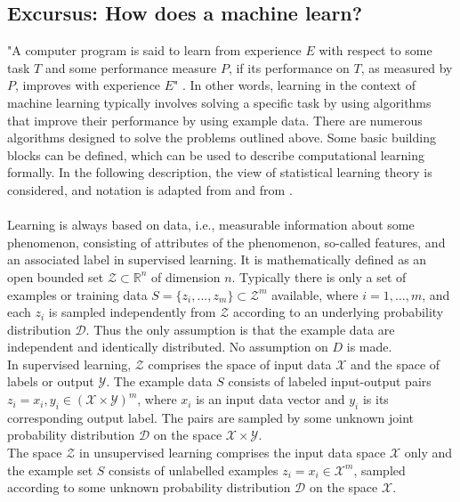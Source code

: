 \begin{tcolorbox}
    \subsection*{Excursus: How does a machine learn?}
    "A computer program is said to learn from experience $E$ with respect to some task $T$ and some performance measure $P$, if its performance on $T$, as measured by $P$, improves with experience $E$" \cite{Mitchell1997}. In other words, learning in the context of machine learning typically involves solving a specific task by using algorithms that improve their performance by using example data. There are numerous algorithms designed to solve the problems outlined above. Some basic building blocks can be defined, which can be used to describe computational learning formally. In the following description, the view of statistical learning theory is considered, and notation is adapted from \citeauthor{Shalev2014} \cite{Shalev2014} and from \citeauthor{Von_luxburg2011} \cite{Von_luxburg2011}.\\
    \\
    Learning is always based on data, i.e., measurable information about some phenomenon, consisting of attributes of the phenomenon, so-called features, and an associated label in supervised learning. It is mathematically defined as an open bounded set $\mathcal{Z}\subset\mathbb{R}^n$ of dimension $n$. Typically there is only a set of examples or training data $S=\{z_i,...,z_m\}\subset{\mathcal{Z}}^m$ available, where $i = 1,\dots,m$, and each $z_i$ is sampled independently from $\mathcal{Z}$ according to an underlying probability distribution $\mathcal{D}$. Thus the only assumption is that the example data are independent and identically distributed. No assumption on $D$ is made.\\
    In supervised learning, $\mathcal{Z}$ comprises the space of input data $\mathcal{X}$ and the space of labels or output $\mathcal{Y}$. The example data $S$ consists of labeled input-output pairs $z_i=x_i,y_i\in(\mathcal{X}\times\mathcal{Y})^m$, where $x_i$ is an input data vector and $y_i$ is its corresponding output label. The pairs are sampled by some unknown joint probability distribution $\mathcal{D}$ on the space $\mathcal{X}\times\mathcal{Y}$.\\
    The space $\mathcal{Z}$ in unsupervised learning comprises the input data space $\mathcal{X}$ only and the example set $S$ consists of unlabelled examples $z_i=x_i\in\mathcal{X}^m$, sampled according to some unknown probability distribution $\mathcal{D}$ on the space $\mathcal{X}$.\\

\end{tcolorbox}
